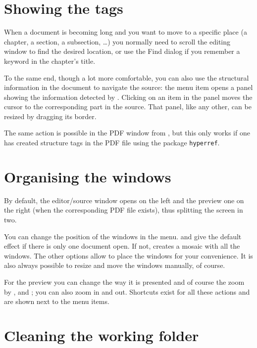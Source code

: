 \section{Showing the tags}

When a document is becoming long and you want to move to a specific place (a chapter, a section, a subsection, \dots) you normally need to scroll the editing window to find the desired location, or use the Find dialog if you remember a keyword in the chapter's title.

To the same end, though a lot more comfortable, you can also use the structural information in the document to navigate the source: the menu item \submenu{}\submenu{} opens a panel showing the information detected by {\Tw}. Clicking on an item in the panel moves the cursor to the corresponding part in the source. That panel, like any other, can be resized by dragging its border.

The same action is possible in the PDF window from \submenu{}\submenu{}, but this only works if one has created structure tags in the PDF file using the package \verb|hyperref|.

\section{Organising the windows}

By default, the editor/source window opens on the left and the preview one on the right (when the corresponding PDF file exists), thus splitting the screen in two.

You can change the position of the windows in the  menu. \submenu{} and \submenu{} give the default effect if there is only one document open. If not, \submenu{} creates a mosaic with all the windows. The other options allow to place the windows for your convenience. It is also always possible to resize and move the windows manually, of course.

For the preview you can change the way it is presented and of course the zoom by \submenu{}, \submenu{} and \submenu{}; you can also zoom in and out. Shortcuts exist for all these actions and are shown next to the menu items.

\section{Cleaning the working folder}
\label{sec:remove-aux-files}

